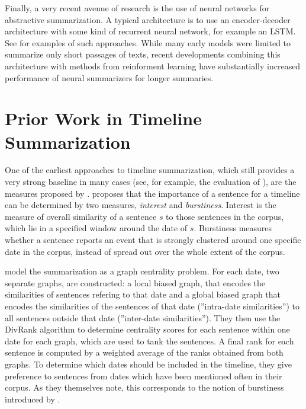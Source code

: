 \documentclass[a4paper,BCOR=10mm]{report}
\begin{document}


Finally, a very recent avenue of research is the use of neural networks for abstractive summarization. A typical architecture is to use an encoder-decoder architecture with some kind of recurrent neural network, for example an LSTM. See \citet{nallapati, rush} for examples of such approaches.
While many early models were limited to summarize only short passages of texts, recent developments combining this architecture with methods from reinforment learning have substantially increased performance of neural summarizers for longer summaries. \citet{paulus}



\section{Prior Work in Timeline Summarization}

One of the earliest approaches to timeline summarization, which still provides a very strong baseline in many cases (see, for example, the evaluation of \citet{markert}), are the measures proposed by \citet{chieu}.
\citeauthor{chieu} proposes that the importance of a sentence for a timeline can be determined by two measures, \textit{interest} and \textit{burstiness}.
Interest is the measure of overall similarity of a sentence $s$ to those sentences in the corpus, which lie in a specified window around the date of $s$.
Burstiness measures whether a sentence reports an event that is strongly clustered around one specific date in the corpus, instead of spread out over the whole extent of the corpus.


\citet{yan-trans} model the summarization as a graph centrality problem. For each date, two separate graphs, are constructed: a local biased graph, that encodes the similarities of sentences refering to that date and a global biased graph that encodes the similarities of the sentences of that date (''intra-date similarities'') to all sentences outside that date (''inter-date similarities'').
They then use the DivRank \citep{divrank} algorithm to determine centrality scores for each sentence within one date for each graph, which are used to tank the sentences.
A final rank for each sentence is computed by a weighted average of the ranks obtained from both graphs. To determine which dates should be included in the timeline, they give preference to sentences from dates which have been mentioned often in their corpus. As they themselves note, this corresponds to the notion of burstiness introduced by \citeauthor{chieu}.
\end{document}
